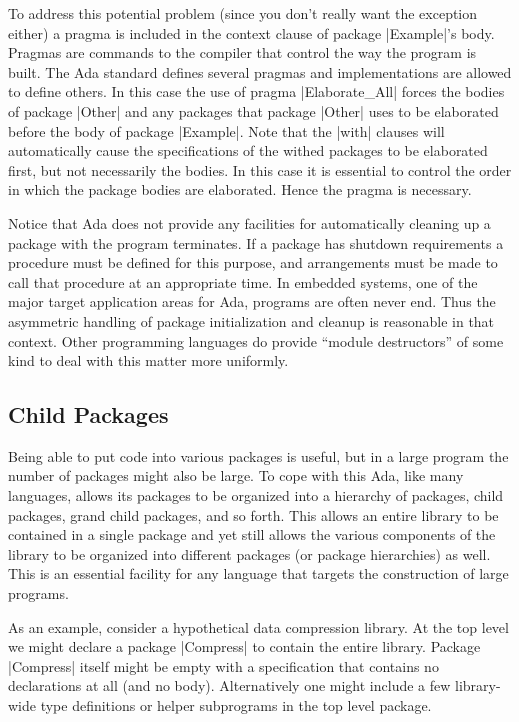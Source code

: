 To address this potential problem (since you don't really want the exception either) a pragma is
included in the context clause of package |Example|'s body. Pragmas are commands to the compiler
that control the way the program is built. The Ada standard defines several pragmas and
implementations are allowed to define others. In this case the use of pragma |Elaborate_All|
forces the bodies of package |Other| and any packages that package |Other| uses to be elaborated
before the body of package |Example|. Note that the |with| clauses will automatically cause the
specifications of the withed packages to be elaborated first, but not necessarily the bodies. In
this case it is essential to control the order in which the package bodies are elaborated. Hence
the pragma is necessary.

Notice that Ada does not provide any facilities for automatically cleaning up a package with the
program terminates. If a package has shutdown requirements a procedure must be defined for this
purpose, and arrangements must be made to call that procedure at an appropriate time. In
embedded systems, one of the major target application areas for Ada, programs are often never
end. Thus the asymmetric handling of package initialization and cleanup is reasonable in that
context. Other programming languages do provide ``module destructors'' of some kind to deal with
this matter more uniformly.

\subsection{Child Packages}

Being able to put code into various packages is useful, but in a large program the number of
packages might also be large. To cope with this Ada, like many languages, allows its packages to
be organized into a hierarchy of packages, child packages, grand child packages, and so forth.
This allows an entire library to be contained in a single package and yet still allows the
various components of the library to be organized into different packages (or package
hierarchies) as well. This is an essential facility for any language that targets the
construction of large programs.

As an example, consider a hypothetical data compression library. At the top level we might
declare a package |Compress| to contain the entire library. Package |Compress| itself might be
empty with a specification that contains no declarations at all (and no body). Alternatively one
might include a few library-wide type definitions or helper subprograms in the top level
package.

